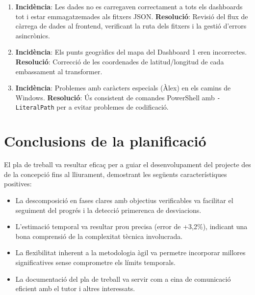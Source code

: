 \begin{enumerate}
    \item \textbf{Incidència}: Les dades no es carregaven correctament a tots els dashboards tot i estar emmagatzemades als fitxers JSON.
    \textbf{Resolució}: Revisió del flux de càrrega de dades al frontend, verificant la ruta dels fitxers i la gestió d'errors asincrònics.
    
    \item \textbf{Incidència}: Els punts geogràfics del mapa del Dashboard 1 eren incorrectes.
    \textbf{Resolució}: Correcció de les coordenades de latitud/longitud de cada embassament al transformer.
    
    \item \textbf{Incidència}: Problemes amb caràcters especials (Àlex) en els camins de Windows.
    \textbf{Resolució}: Ús consistent de comandes PowerShell amb \texttt{-LiteralPath} per a evitar problemes de codificació.
\end{enumerate}


\section{Conclusions de la planificació}

El pla de treball va resultar eficaç per a guiar el desenvolupament del projecte des de la concepció fins al lliurament, demostrant les següents característiques positives:
\begin{itemize}
    \item La descomposició en fases clares amb objectius verificables va facilitar el seguiment del progrés i la detecció primerenca de desviacions.
    \item L'estimació temporal va resultar prou precisa (error de +3,2\%), indicant una bona comprensió de la complexitat tècnica involucrada.
    \item La flexibilitat inherent a la metodologia àgil va permetre incorporar millores significatives sense comprometre els límits temporals.
    \item La documentació del pla de treball va servir com a eina de comunicació eficient amb el tutor i altres interessats.
\end{itemize}

